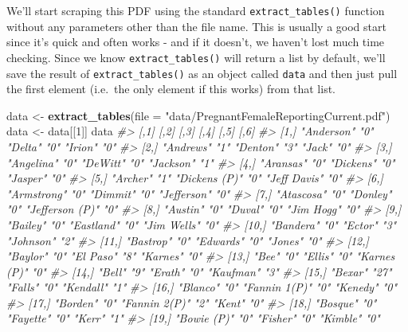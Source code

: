 \documentclass[
  12pt,
]{book}
\newenvironment{Shaded}{\begin{snugshade}}{\end{snugshade}}
\newcommand{\CommentTok}[1]{\textcolor[rgb]{0.37,0.37,0.37}{\textit{#1}}}
\newcommand{\DataTypeTok}[1]{\textcolor[rgb]{0.27,0.27,0.27}{#1}}
\newcommand{\DecValTok}[1]{\textcolor[rgb]{0.06,0.06,0.06}{#1}}
\newcommand{\KeywordTok}[1]{\textcolor[rgb]{0.27,0.27,0.27}{\textbf{#1}}}
\newcommand{\NormalTok}[1]{#1}
\newcommand{\StringTok}[1]{\textcolor[rgb]{0.5,0.5,0.5}{#1}}
\begin{document}
We'll start scraping this PDF using the standard \texttt{extract\_tables()} function without any parameters other than the file name. This is usually a good start since it's quick and often works - and if it doesn't, we haven't lost much time checking. Since we know \texttt{extract\_tables()} will return a list by default, we'll save the result of \texttt{extract\_tables()} as an object called \texttt{data} and then just pull the first element (i.e.~the only element if this works) from that list.

\begin{Shaded}
\begin{Highlighting}[]
\NormalTok{data <{-}}\StringTok{ }\KeywordTok{extract\_tables}\NormalTok{(}\DataTypeTok{file =} \StringTok{"data/PregnantFemaleReportingCurrent.pdf"}\NormalTok{)}
\NormalTok{data <{-}}\StringTok{ }\NormalTok{data[[}\DecValTok{1}\NormalTok{]]}
\NormalTok{data}
\CommentTok{\#>       [,1]            [,2] [,3]          [,4] [,5]            [,6]}
\CommentTok{\#>  [1,] "Anderson"      "0"  "Delta"       "0"  "Irion"         "0" }
\CommentTok{\#>  [2,] "Andrews"       "1"  "Denton"      "3"  "Jack"          "0" }
\CommentTok{\#>  [3,] "Angelina"      "0"  "DeWitt"      "0"  "Jackson"       "1" }
\CommentTok{\#>  [4,] "Aransas"       "0"  "Dickens"     "0"  "Jasper"        "0" }
\CommentTok{\#>  [5,] "Archer"        "1"  "Dickens (P)" "0"  "Jeff Davis"    "0" }
\CommentTok{\#>  [6,] "Armstrong"     "0"  "Dimmit"      "0"  "Jefferson"     "0" }
\CommentTok{\#>  [7,] "Atascosa"      "0"  "Donley"      "0"  "Jefferson (P)" "0" }
\CommentTok{\#>  [8,] "Austin"        "0"  "Duval"       "0"  "Jim Hogg"      "0" }
\CommentTok{\#>  [9,] "Bailey"        "0"  "Eastland"    "0"  "Jim Wells"     "0" }
\CommentTok{\#> [10,] "Bandera"       "0"  "Ector"       "3"  "Johnson"       "2" }
\CommentTok{\#> [11,] "Bastrop"       "0"  "Edwards"     "0"  "Jones"         "0" }
\CommentTok{\#> [12,] "Baylor"        "0"  "El Paso"     "8"  "Karnes"        "0" }
\CommentTok{\#> [13,] "Bee"           "0"  "Ellis"       "0"  "Karnes (P)"    "0" }
\CommentTok{\#> [14,] "Bell"          "9"  "Erath"       "0"  "Kaufman"       "3" }
\CommentTok{\#> [15,] "Bexar"         "27" "Falls"       "0"  "Kendall"       "1" }
\CommentTok{\#> [16,] "Blanco"        "0"  "Fannin 1(P)" "0"  "Kenedy"        "0" }
\CommentTok{\#> [17,] "Borden"        "0"  "Fannin 2(P)" "2"  "Kent"          "0" }
\CommentTok{\#> [18,] "Bosque"        "0"  "Fayette"     "0"  "Kerr"          "1" }
\CommentTok{\#> [19,] "Bowie (P)"     "0"  "Fisher"      "0"  "Kimble"        "0" }

\end{Highlighting}
\end{Shaded}
\end{document}
